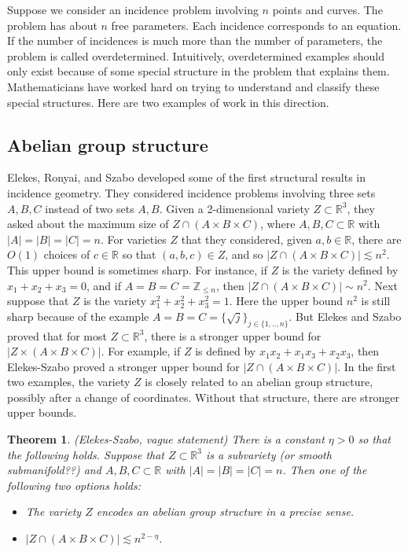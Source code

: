 \documentclass{amsart}
\newtheorem{theorem}[prop]{Theorem}
\newcommand{\ZZ}{\mathbb{Z}}
\newcommand{\RR}{\mathbb{R}}
\begin{document}
Suppose we consider an incidence problem involving $n$ points and curves.  The problem has about $n$ free parameters.  Each incidence corresponds to an equation.  If the number of incidences is much more than the number of parameters, the problem is called overdetermined.  Intuitively, overdetermined examples should only exist because of some special structure in the problem that explains them.  Mathematicians have worked hard on trying to understand and classify these special structures.  Here are two examples of work in this direction.

\subsection{Abelian group structure}

Elekes, Ronyai, and Szabo developed some of the first structural results in incidence geometry.  They considered incidence problems involving three sets $A, B, C$ instead of two sets $A,B$.  Given a 2-dimensional variety $Z \subset \RR^3$, they asked about the maximum size of $Z \cap (A \times B \times C)$, where $A, B, C \subset \RR$ with $|A| = |B| = |C| = n$.  For varieties $Z$ that they considered, given $a,b \in \RR$, there are $O(1)$ choices of $c \in \RR$ so that $(a,b,c) \in Z$, and so $| Z \cap (A \times B \times C) | \lesssim n^2$.  This upper bound is sometimes sharp.  For instance, if $Z$ is the variety defined by $x_1 + x_2 + x_3 = 0$, and if $A = B = C = \ZZ_{\le n}$, then $|Z \cap (A \times B \times C) | \sim n^2$.  Next suppose that $Z$ is the variety $x_1^2 + x_2^2 + x_3^2 = 1$.  Here the upper bound $n^2$ is still sharp because of the example $A = B = C = \{ \sqrt{j} \}_{j \in \{1, .., n \}}$.  But Elekes and Szabo proved that for most $Z \subset \RR^3$, there is a stronger upper bound for $|Z \times (A \times B \times C)|$.  For example, if $Z$ is defined by $x_1 x_2 + x_1 x_3  + x_2 x_3$, then Elekes-Szabo proved a stronger upper bound for $|Z \cap (A \times B \times C)|$.  In the first two examples, the variety $Z$ is closely related to an abelian group structure, possibly after a change of coordinates.  Without that structure, there are stronger upper bounds.

\begin{theorem} \label{thmes} (Elekes-Szabo, vague statement) There is a constant $\eta > 0$ so that the following holds.  Suppose that $Z \subset \RR^3$ is a subvariety (or smooth submanifold??) and $A, B, C \subset \RR$ with $|A| = |B| = |C| =n$.  Then one of the following two options holds: 

\begin{itemize}

\item The variety $Z$ encodes an abelian group structure in a precise sense.

\item $|Z \cap (A \times B \times C) | \lesssim n^{2 - \eta}$.

\end{itemize}

\end{theorem}
\end{document}
